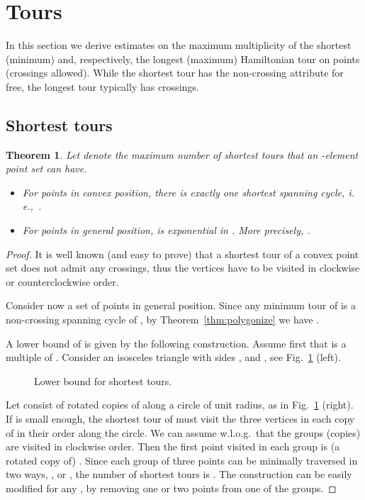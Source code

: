 \documentclass[11pt]{article}
\newtheorem{theorem}{Theorem}
\def\ie{{\it i.\,e.},~}
\begin{document}
\section {Tours}\label{sec:tours}

In this section we derive estimates on the maximum multiplicity of
the shortest (minimum) and, respectively, the longest (maximum) Hamiltonian
tour on  points (crossings allowed).
While the shortest tour has the non-crossing attribute for
free, the longest tour typically has crossings.


\subsection{Shortest tours}
\begin{theorem} \label{thm:min-tours}
Let  denote the maximum number of shortest tours that
an -element point set can have.
\begin{itemize}
\item [{\rm (i)}] For points in convex position, there is exactly
  one shortest spanning cycle, \ie .
\item [{\rm (ii)}] For points in general position, 
is exponential in . More precisely,
.
\end{itemize}
\end{theorem}
\begin{proof}
It is well known (and easy to prove) that a shortest tour of a convex
point set does not admit any crossings, thus the vertices have to be
visited in clockwise or counterclockwise order.

\smallskip
{} Consider now a set  of  points in general
position. Since any minimum tour of  is a non-crossing spanning cycle of ,
by Theorem~\ref{thm:polygonize} we have .

A lower bound of  is given by the following construction.
Assume first that  is a multiple of . Consider an isosceles
triangle  with sides ,  and ,
see Fig.~\ref{f2} (left).
\begin{figure}[htbp]
\centerline{\epsfysize=2.1in }
\caption{Lower bound for shortest tours.}
\label{f2}
\end{figure}
Let  consist of  rotated copies of 
along a circle of unit radius, as in Fig.~\ref{f2} (right).
If  is small enough, the shortest tour of  must visit the three
vertices in each copy of  in their order along the circle.
We can assume w.l.o.g.\ that the groups (copies) are visited in clockwise order.
Then the first point visited in each group is (a rotated copy of) .
Since each group of three points can be minimally traversed in two
ways, , or , the number of shortest tours is .
The construction can be easily modified for any ,
by removing one or two points from one of the groups.
\end{proof}
\end{document}
